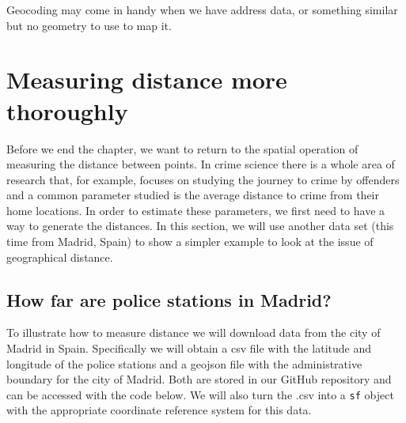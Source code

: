 \documentclass[
]{book}
\makeatletter
\newenvironment{Shaded}{\begin{snugshade}}{\end{snugshade}}
\newcommand{\AttributeTok}[1]{\textcolor[rgb]{0.61,0.61,0.61}{#1}}
\newcommand{\CommentTok}[1]{\textcolor[rgb]{0.37,0.37,0.37}{\textit{#1}}}
\newcommand{\DecValTok}[1]{\textcolor[rgb]{0.06,0.06,0.06}{#1}}
\newcommand{\FunctionTok}[1]{\textcolor[rgb]{0,0,0}{#1}}
\newcommand{\NormalTok}[1]{#1}
\newcommand{\OtherTok}[1]{\textcolor[rgb]{0.37,0.37,0.37}{#1}}
\newcommand{\SpecialCharTok}[1]{\textcolor[rgb]{0,0,0}{#1}}
\newcommand{\StringTok}[1]{\textcolor[rgb]{0.5,0.5,0.5}{#1}}
\newenvironment{kframe}{%
\medskip{}
\setlength{\fboxsep}{.8em}
 \def\at@end@of@kframe{}%
 \ifinner\ifhmode%
  \def\at@end@of@kframe{\end{minipage}}%
  \begin{minipage}{\columnwidth}%
 \fi\fi%
 \def\FrameCommand##1{\hskip\@totalleftmargin \hskip-\fboxsep
 \colorbox{shadecolor}{##1}\hskip-\fboxsep
     \hskip-\linewidth \hskip-\@totalleftmargin \hskip\columnwidth}%
 \MakeFramed {\advance\hsize-\width
   \@totalleftmargin\z@ \linewidth\hsize
   \@setminipage}}%
 {\par\unskip\endMakeFramed%
 \at@end@of@kframe}
\renewenvironment{Shaded}{\begin{kframe}}{\end{kframe}}
\makeatother
\begin{document}
Geocoding may come in handy when we have address data, or something similar but no geometry to use to map it.

\hypertarget{measuring-distance-more-thoroughly}{%
\section{Measuring distance more thoroughly}\label{measuring-distance-more-thoroughly}}

Before we end the chapter, we want to return to the spatial operation of measuring the distance between points. In crime science there is a whole area of research that, for example, focuses on studying the journey to crime by offenders and a common parameter studied is the average distance to crime from their home locations. In order to estimate these parameters, we first need to have a way to generate the distances. In this section, we will use another data set (this time from Madrid, Spain) to show a simpler example to look at the issue of geographical distance.

\hypertarget{how-far-are-police-stations-in-madrid}{%
\subsection{How far are police stations in Madrid?}\label{how-far-are-police-stations-in-madrid}}

To illustrate how to measure distance we will download data from the city of Madrid in Spain. Specifically we will obtain a csv file with the latitude and longitude of the police stations and a geojson file with the administrative boundary for the city of Madrid. Both are stored in our GitHub repository and can be accessed with the code below. We will also turn the .csv into a \texttt{sf} object with the appropriate coordinate reference system for this data.

\begin{Shaded}
\end{Shaded}
\end{document}
